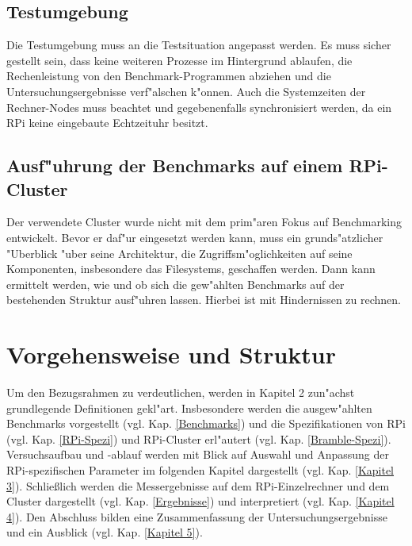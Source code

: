 \subsection{Testumgebung}\label{Testumgebung}

Die Testumgebung muss an die Testsituation angepasst werden. Es muss sicher gestellt sein, dass keine weiteren Prozesse im Hintergrund ablaufen, die Rechenleistung von den Benchmark-Programmen abziehen und die Untersuchungsergebnisse verf"alschen k"onnen. Auch die Systemzeiten der Rechner-Nodes muss beachtet und gegebenenfalls synchronisiert werden, da ein RPi keine eingebaute Echtzeituhr besitzt. 

\subsection{Ausf"uhrung der Benchmarks auf einem RPi-Cluster}\label{Anpassung Cluster}

Der verwendete Cluster wurde nicht mit dem prim"aren Fokus auf Benchmarking entwickelt. Bevor er daf"ur eingesetzt werden kann, muss ein grunds"atzlicher "Uberblick "uber seine Architektur, die Zugriffsm"oglichkeiten auf seine Komponenten, insbesondere das Filesystems, geschaffen werden. Dann kann ermittelt werden, wie und ob sich die gew"ahlten Benchmarks auf der bestehenden Struktur ausf"uhren lassen. Hierbei ist mit Hindernissen zu rechnen. 
\newpage
\section{Vorgehensweise und Struktur}\label{Struktur}

Um den Bezugsrahmen zu verdeutlichen, werden in Kapitel 2 zun"achst grundlegende Definitionen gekl"art. Insbesondere werden die ausgew"ahlten Benchmarks vorgestellt (vgl. Kap. \ref{Benchmarks}) und die Spezifikationen von RPi (vgl. Kap. \ref{RPi-Spezi}) und RPi-Cluster erl"autert (vgl. Kap. \ref{Bramble-Spezi}). Versuchsaufbau und -ablauf werden mit Blick auf Auswahl und Anpassung der RPi-spezifischen Parameter im folgenden Kapitel dargestellt (vgl. Kap. \ref{Kapitel 3}). Schlie\ss lich  werden die Messergebnisse auf dem RPi-Einzelrechner und dem Cluster dargestellt (vgl. Kap. \ref{Ergebnisse}) und interpretiert (vgl. Kap. \ref{Kapitel 4}). Den Abschluss bilden eine Zusammenfassung der Untersuchungsergebnisse und ein Ausblick (vgl. Kap. \ref{Kapitel 5}).

\endinput 
